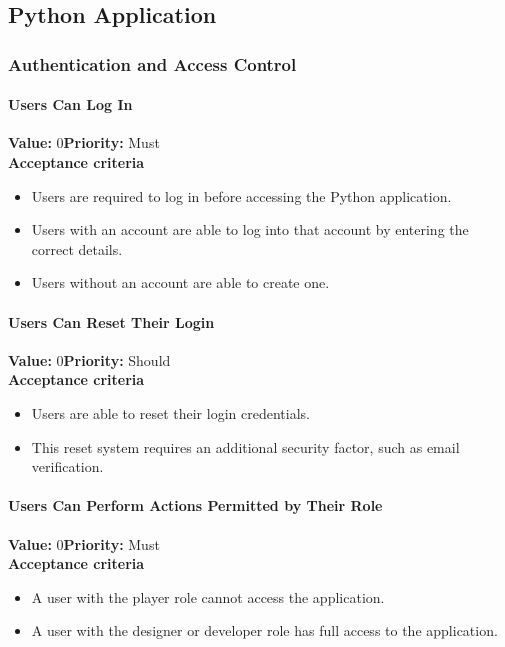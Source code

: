 \subsection{Python Application}

\subsubsection{Authentication and Access Control}

\paragraph{Users Can Log In}
\textbf{Value:} 0\quad \textbf{Priority:} Must\\
\textbf{Acceptance criteria}
\begin{itemize}
  \item Users are required to log in before accessing the Python application.
  \item Users with an account are able to log into that account by entering the correct details.
  \item Users without an account are able to create one.
\end{itemize}

\paragraph{Users Can Reset Their Login}
\textbf{Value:} 0\quad \textbf{Priority:} Should\\
\textbf{Acceptance criteria}
\begin{itemize}
  \item Users are able to reset their login credentials.
  \item This reset system requires an additional security factor, such as email verification.
\end{itemize}

\paragraph{Users Can Perform Actions Permitted by Their Role}
\textbf{Value:} 0\quad \textbf{Priority:} Must\\
\textbf{Acceptance criteria}
\begin{itemize}
  \item A user with the player role cannot access the application.
  \item A user with the designer or developer role has full access to the application.
\end{itemize}

